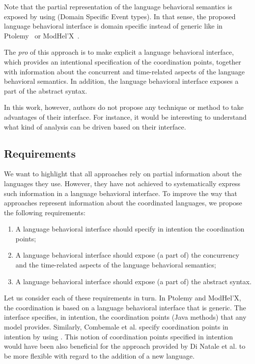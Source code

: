 {Note that the partial representation of the language behavioral semantics is exposed by using \dse (Domain Specific Event types). In that sense, the proposed language behavioral interface is domain specific instead of generic like in Ptolemy~\cite{ptoleframebib} or ModHel'X~\cite{modhelxbib}. 

The \emph{pro} of this approach is to make explicit a language behavioral interface, which provides an intentional specification of the coordination points, together with information about the concurrent and time-related aspects of the language behavioral semantics. In addition, the language behavioral interface exposes a part of the abstract syntax.   

In this work, however, authors do not propose any technique or method to take advantages of their interface. For instance, it would be interesting to understand what kind of analysis can be driven based on their interface.


\subsection{Requirements}
We want to highlight that all approaches rely on partial information about the languages they use. However, they have not achieved to systematically express such information in a language behavioral interface. To improve the way that approaches represent information about the coordinated languages, we propose the following requirements: 

\begin{enumerate}
	\item A language behavioral interface should specify in intention the coordination points;
	\item A language behavioral interface should expose (a part of) the concurrency and the time-related aspects of the language behavioral semantics;
	\item A language behavioral interface should expose (a part of) the abstract syntax.
\end{enumerate}
    
Let us consider each of these requirements in turn. In Ptolemy and ModHel'X, the coordination is based on a language behavioral interface that is generic. The interface specifies, in intention, the coordination points (\ie Java methods) that any model provides. Similarly, Combemale et al. specify coordination points in intention by using \dse. This notion of coordination points specified in intention would have been also beneficial for the approach provided by Di Natale et al. to be more flexible with regard to the addition of a new language.

}
